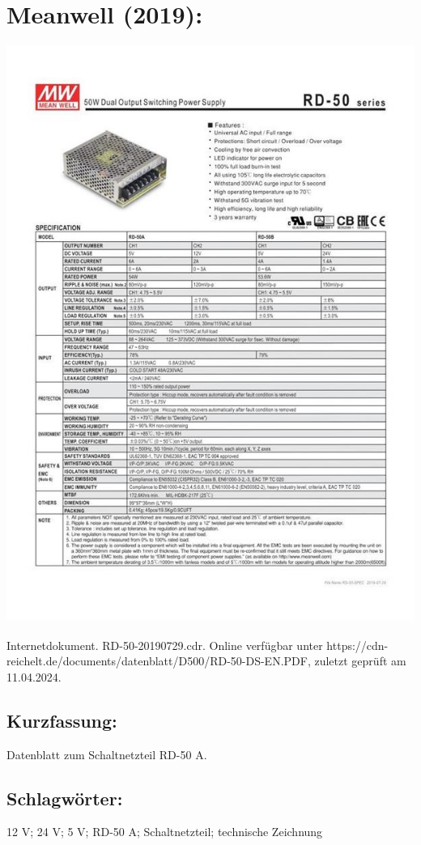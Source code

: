 \section*{Meanwell (2019):}
\begin{minipage}{0.5\textwidth}
	\includegraphics[width=\linewidth]{../Appendix/Literaturverzeichnis/img/Meanwell.jpg}
\end{minipage}
\hfill
\begin{minipage}{0.48\textwidth}
Internetdokument. RD-50-20190729.cdr.
Online verfügbar unter https://cdn-reichelt.de/documents/datenblatt/D500/RD-50-DS-EN.PDF, zuletzt geprüft am 11.04.2024.
\subsection*{Kurzfassung:}
Datenblatt zum Schaltnetzteil RD-50 A.
\subsection*{Schlagwörter:}
12 V; 24 V; 5 V; RD-50 A; Schaltnetzteil; technische Zeichnung
\end{minipage}
